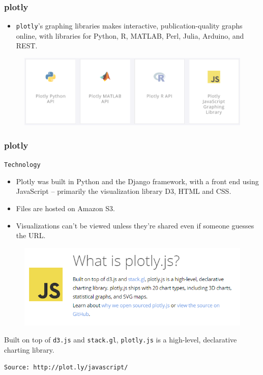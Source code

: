\documentclass{beamer}
\begin{document}
\begin{frame}
\frametitle{plotly}
\Large	
\begin{itemize}
	\item \texttt{plotly}'s graphing libraries makes interactive, publication-quality graphs online, with libraries for Python, R, MATLAB, Perl, Julia, Arduino, and REST.
\end{itemize}
\begin{figure}
\centering
\includegraphics[width=1.05\linewidth]{plotlyapis}

\end{figure}

\end{frame}

\begin{frame}
\frametitle{plotly}
\Large	
	\texttt{Technology}
\begin{itemize}
	\item Plotly was built in Python and the Django framework, with a front end using JavaScript -- primarily the visualization library D3, HTML and CSS. 
	\item Files are hosted on Amazon S3. 
	\item Visualizations can't be viewed unless they're shared even if someone guesses the URL.
\end{itemize}
\end{frame}

\begin{frame}[fragile]
	\Large
\vspace{-1cm}

	\begin{figure}
\centering
\includegraphics[width=1.10\linewidth]{plotlyjs}

\end{figure}
Built on top of \texttt{d3.js} and \texttt{stack.gl}, \texttt{plotly.js} is a high-level, declarative charting library.
{
\large
\begin{verbatim}
Source: http://plot.ly/javascript/
\end{verbatim}
}
\end{frame}
\end{document}
